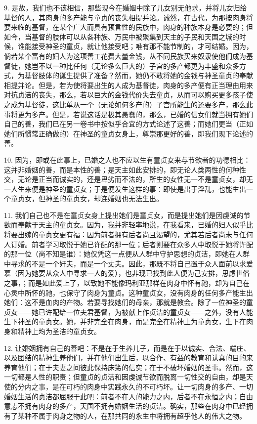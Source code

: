 9. 是故，我们也不该相信，那些现今在婚姻中除了儿女别无他求，并将儿女归给基督的人，其肉身的多产能与童贞的丧失相提并论。诚然，在古代，为那按肉身将要来临的基督，在某个广大而具有预言性的民族中，肉身的种族本身是必要的；但如今，当基督的肢体可以从各种族、万民中被聚集到天主的子民和天国之城的时候，谁能接受神圣的童贞，就让他接受吧；唯有那不能节制的，才可结婚。因为，倘若某个富有的妇人为这项善工花费大量金钱，从不同民族买来奴隶使他们成为基督徒，她岂不以一种比任何（无论多么巨大的）子宫的多产都更为丰盛和众多方式，为基督肢体的诞生提供了准备？然而，她仍不敢将她的金钱与神圣童贞的奉献相提并论。但是，若为使将要出生的人成为基督徒，肉身的多产便有正当理由用来对抗贞洁的丧失，那么，若以巨大的金钱代价失去童贞，从而可以购买更多孩子使之成为基督徒，这比单从一个（无论如何多产的）子宫所能生的还要多产，那么此事将更为多产。但是，若说这话是极其愚蠢的，那么，已婚的信女们就当拥有她们自己的善，我们已在另一卷书中按似乎合宜的方式论述了这善；而她们更当（正如她们所惯常正确做的）在神圣的童贞女身上，尊崇那更好的善，即我们现下论述的善。\par

10. 因为，即或在此事上，已婚之人也不应以生有童贞女来与节欲者的功德相比：这并非婚姻的善，而是本性的善；是天主如此安排的，即无论人类两性的何种性交，无论是正当而诚实的，还是卑劣而不法的，所生的女性无一不是童贞女，却无一人生来便是神圣的童贞女；于是便发生这样的事：即使是出于淫乱，也能生出一个童贞女，但神圣的童贞女，却连婚姻也无法生出。\par

11. 我们自己也不是在童贞女身上提出她们是童贞女，而是提出她们是因虔诚的节欲而奉献于天主的童贞女。因为，我并非轻率地说，在我看来，已婚的妇人似乎比将要出嫁的童贞女更有福：因为前者拥有后者尚且渴望的，尤其若后者尚未与任何人订婚。前者学习取悦于她已许配的那一位；后者则要在众多人中取悦于她将许配的那一位（尚不知是谁）：她仅凭这一点便从人群中守护思想的贞洁，即她在人群中寻求的不是一个奸夫，而是一个丈夫。因此，那既不将自己置于众人面前以求爱慕（因为她要从众人中寻求一人的爱），也非现已找到此人便为己安排，思虑世俗之事，；而是如此爱上了，以致她不能像玛利亚那样在肉身中怀有祂，却为自己在心灵中所怀的祂，也保守了肉身为童贞。这种童贞女，没有肉身的任何多产能生出她们：这不是血肉的产物。若要寻找她们的母亲，那就是教会。除了一位神圣的童贞女——她已许配给一位夫君基督，为被献上作贞洁的童贞女——之外，没有人能生下神圣的童贞女。她，并非完全在肉身，而是完全在精神上为童贞女，生下在肉身和精神上均为圣洁的童贞女。\par

12. 让婚姻拥有自己的善吧：不是在于生养儿子，而是在于以诚实、合法、端庄、以及团结的精神生养他们，并在他们出生后，以合作、有益的教育和认真的目的来养育他们；在于夫妻之间彼此保持床笫的信实；在于不破坏婚姻的圣事。然而，这一切都是人性的职责；但童贞的贞洁和因虔诚节欲而脱离一切性交的自由，却是天使的分内之事，是在可朽的肉身中实践永久的不可朽坏。让一切肉身的多产、一切婚姻生活的贞洁都屈服于此吧：前者不在人的能力之内，后者不在永恒之内；自由意志不拥有肉身的多产，天国不拥有婚姻生活的贞洁。确实，那些在肉身中已经拥有了某种不属于肉身之物的人，在那共同的永生中将拥有超乎他人的伟大之物。\par

